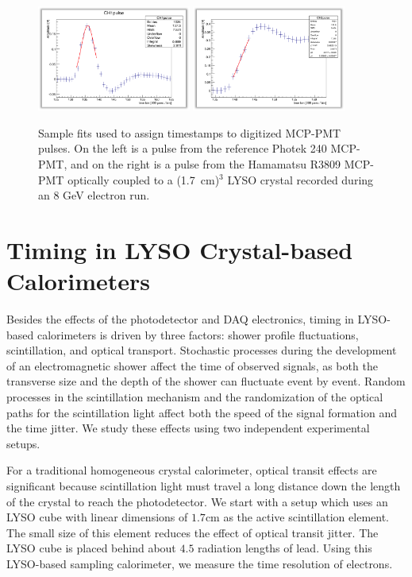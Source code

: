 \documentclass[12pt]{article}
\begin{document}
\begin{figure}[h] \centering
\includegraphics[width=0.45\textwidth]{figs/RefPulseFit} 
\includegraphics[width=0.45\textwidth]{figs/ScintPulseFit} 
\caption{Sample fits used to assign timestamps to digitized MCP-PMT pulses. 
On the left is a pulse from the reference Photek 240 MCP-PMT, and
on the right is a pulse from the Hamamatsu R3809 MCP-PMT
optically coupled to a (1.7~cm)$^{3}$  LYSO crystal
recorded during an 8 GeV electron run.}
\label{fig:PulseFits}
\end{figure}


\section{Timing in LYSO Crystal-based Calorimeters}

Besides the effects of the photodetector and DAQ electronics, timing in
LYSO-based calorimeters is driven by three factors: shower profile fluctuations,
scintillation, and optical transport. Stochastic processes during the
development of an electromagnetic shower affect the time of observed signals, as
both the transverse size and the depth of the shower can fluctuate event by
event. Random processes in the scintillation mechanism and the randomization of
the optical paths for the scintillation light affect both the speed of the
signal formation and the time jitter. We study these effects using two
independent experimental setups. 

For a traditional homogeneous crystal calorimeter, optical transit effects are
significant because scintillation light must travel a long distance down the
length of the crystal to reach the photodetector. We start with a setup which
uses an LYSO cube with linear dimensions of $1.7\mathrm{cm}$ as the active
scintillation element. The small size of this element reduces the effect of
optical transit jitter. The LYSO cube is placed behind about $4.5$ radiation
lengths of lead. Using this LYSO-based sampling calorimeter, we measure the time
resolution of electrons.
\end{document}
